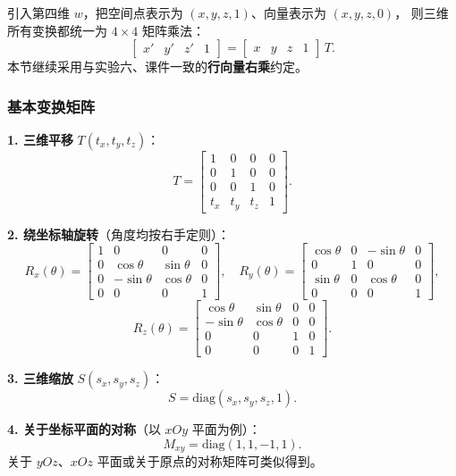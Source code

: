 \documentclass[a4paper,12pt]{ctexart}
\begin{document}
引入第四维 $w$，把空间点表示为 $(x,y,z,1)$、向量表示为 $(x,y,z,0)$，
则三维所有变换都统一为 $4\times 4$ 矩阵乘法：
\[
    \begin{bmatrix} x' & y' & z' & 1 \end{bmatrix}
    =
    \begin{bmatrix} x & y & z & 1 \end{bmatrix}\,T .
\]
本节继续采用与实验六、课件一致的\textbf{行向量右乘}约定。

\subsubsection{基本变换矩阵}

\textbf{1. 三维平移} $T(t_x,t_y,t_z)$：
\[
    T =
    \begin{bmatrix}
        1 & 0 & 0 & 0 \\
        0 & 1 & 0 & 0 \\
        0 & 0 & 1 & 0 \\
        t_x & t_y & t_z & 1
    \end{bmatrix}.
\]

\textbf{2. 绕坐标轴旋转}（角度均按右手定则）：
\[
    R_x(\theta) =
    \begin{bmatrix}
        1 & 0 & 0 & 0 \\
        0 & \cos\theta & \sin\theta & 0 \\
        0 & -\sin\theta & \cos\theta & 0 \\
        0 & 0 & 0 & 1
    \end{bmatrix},\quad
    R_y(\theta) =
    \begin{bmatrix}
        \cos\theta & 0 & -\sin\theta & 0 \\
        0 & 1 & 0 & 0 \\
        \sin\theta & 0 & \cos\theta & 0 \\
        0 & 0 & 0 & 1
    \end{bmatrix},
\]
\[
    R_z(\theta) =
    \begin{bmatrix}
        \cos\theta & \sin\theta & 0 & 0 \\
        -\sin\theta & \cos\theta & 0 & 0 \\
        0 & 0 & 1 & 0 \\
        0 & 0 & 0 & 1
    \end{bmatrix}.
\]

\textbf{3. 三维缩放} $S(s_x,s_y,s_z)$：
\[
    S = \mathrm{diag}(s_x,s_y,s_z,1).
\]

\textbf{4. 关于坐标平面的对称}（以 $xOy$ 平面为例）：
\[
    M_{xy} = \mathrm{diag}(1,1,-1,1).
\]
关于 $yOz$、$xOz$ 平面或关于原点的对称矩阵可类似得到。
\end{document}
